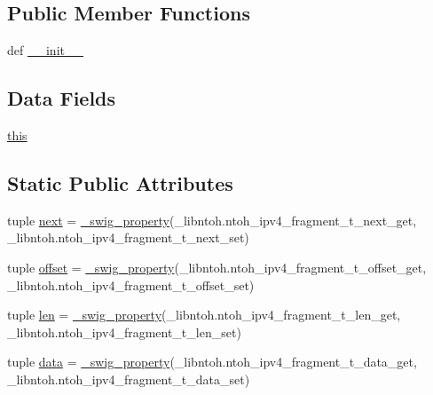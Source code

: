 \subsection*{Public Member Functions}
\begin{DoxyCompactItemize}
\item 
def \hyperlink{classlibntoh_1_1ntoh__ipv4__fragment__t_ac775ee34451fdfa742b318538164070e}{\-\_\-\-\_\-init\-\_\-\-\_\-}
\end{DoxyCompactItemize}
\subsection*{Data Fields}
\begin{DoxyCompactItemize}
\item 
\hyperlink{classlibntoh_1_1ntoh__ipv4__fragment__t_a05c09a5e9d53fa7adf0a7936038c2fa3}{this}
\end{DoxyCompactItemize}
\subsection*{Static Public Attributes}
\begin{DoxyCompactItemize}
\item 
tuple \hyperlink{classlibntoh_1_1ntoh__ipv4__fragment__t_a84e6dac37062f5a539ece8248c8567cc}{next} = \hyperlink{namespacelibntoh_ae6f5626f776538e0cdb00e75ca1c96c9}{\-\_\-swig\-\_\-property}(\-\_\-libntoh.\-ntoh\-\_\-ipv4\-\_\-fragment\-\_\-t\-\_\-next\-\_\-get, \-\_\-libntoh.\-ntoh\-\_\-ipv4\-\_\-fragment\-\_\-t\-\_\-next\-\_\-set)
\item 
tuple \hyperlink{classlibntoh_1_1ntoh__ipv4__fragment__t_a03fbaceb13719d1bc975d26c3b92761a}{offset} = \hyperlink{namespacelibntoh_ae6f5626f776538e0cdb00e75ca1c96c9}{\-\_\-swig\-\_\-property}(\-\_\-libntoh.\-ntoh\-\_\-ipv4\-\_\-fragment\-\_\-t\-\_\-offset\-\_\-get, \-\_\-libntoh.\-ntoh\-\_\-ipv4\-\_\-fragment\-\_\-t\-\_\-offset\-\_\-set)
\item 
tuple \hyperlink{classlibntoh_1_1ntoh__ipv4__fragment__t_af8e41b97a0d8adea11037648944de58f}{len} = \hyperlink{namespacelibntoh_ae6f5626f776538e0cdb00e75ca1c96c9}{\-\_\-swig\-\_\-property}(\-\_\-libntoh.\-ntoh\-\_\-ipv4\-\_\-fragment\-\_\-t\-\_\-len\-\_\-get, \-\_\-libntoh.\-ntoh\-\_\-ipv4\-\_\-fragment\-\_\-t\-\_\-len\-\_\-set)
\item 
tuple \hyperlink{classlibntoh_1_1ntoh__ipv4__fragment__t_aa7a0efb8690a34f61a95b00cc723ca27}{data} = \hyperlink{namespacelibntoh_ae6f5626f776538e0cdb00e75ca1c96c9}{\-\_\-swig\-\_\-property}(\-\_\-libntoh.\-ntoh\-\_\-ipv4\-\_\-fragment\-\_\-t\-\_\-data\-\_\-get, \-\_\-libntoh.\-ntoh\-\_\-ipv4\-\_\-fragment\-\_\-t\-\_\-data\-\_\-set)
\end{DoxyCompactItemize}


